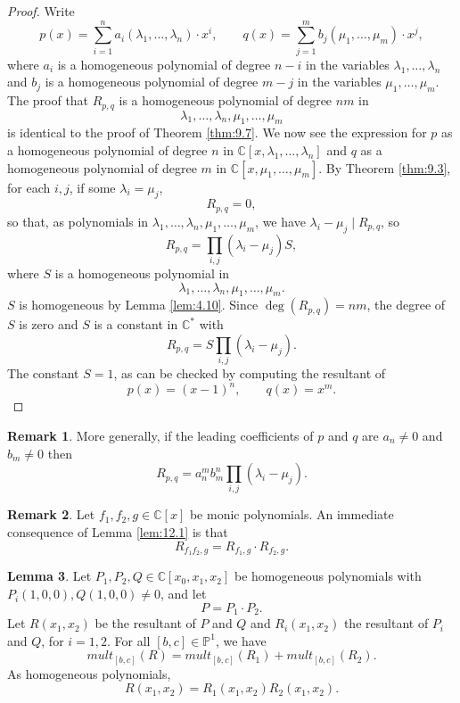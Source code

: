 \documentclass{article}
\newcommand{\C}{\mathbb{C}}
\renewcommand{\P}{\mathbb{P}}
\newcommand{\rb}[1]{\left( #1 \right)}
\renewcommand{\sb}[1]{\left[ #1 \right]}
\theoremstyle{definition}\newtheorem{definition}{Definition}[section]
\theoremstyle{definition}\newtheorem{notation}[definition]{Notation}
\theoremstyle{definition}\newtheorem{remark}[definition]{Remark}
\theoremstyle{definition}\newtheorem{example1}[definition]{Example}
\theoremstyle{definition}\newtheorem{fact}{Fact}
\theoremstyle{definition}\newtheorem{exercise}{Exercise}
\theoremstyle{definition}\newtheorem*{example2}{Example}
\newtheorem{lemma}[definition]{Lemma}
\begin{document}
\begin{proof}
Write
$$ p\rb{x} = \sum_{i = 1}^n a_i\rb{\lambda_1, \dots, \lambda_n} \cdot x^i, \qquad q\rb{x} = \sum_{j = 1}^m b_j\rb{\mu_1, \dots, \mu_m} \cdot x^j, $$
where $ a_i $ is a homogeneous polynomial of degree $ n - i $ in the variables $ \lambda_1, \dots, \lambda_n $ and $ b_j $ is a homogeneous polynomial of degree $ m - j $ in the variables $ \mu_1, \dots, \mu_m $. The proof that $ R_{p, q} $ is a homogeneous polynomial of degree $ nm $ in
$$ \lambda_1, \dots, \lambda_n, \mu_1, \dots, \mu_m $$
is identical to the proof of Theorem \ref{thm:9.7}. We now see the expression for $ p $ as a homogeneous polynomial of degree $ n $ in $ \C\sb{x, \lambda_1, \dots, \lambda_n} $ and $ q $ as a homogeneous polynomial of degree $ m $ in $ \C\sb{x, \mu_1, \dots, \mu_m} $. By Theorem \ref{thm:9.3}, for each $ i, j $, if some $ \lambda_i = \mu_j $,
$$ R_{p, q} = 0, $$
so that, as polynomials in $ \lambda_1, \dots, \lambda_n, \mu_1, \dots, \mu_m $, we have $ \lambda_i - \mu_j \mid R_{p, q} $, so
$$ R_{p, q} = \prod_{i, j} \rb{\lambda_i - \mu_j}S, $$
where $ S $ is a homogeneous polynomial in
$$ \lambda_1, \dots, \lambda_n, \mu_1, \dots, \mu_m. $$
$ S $ is homogeneous by Lemma \ref{lem:4.10}. Since $ \deg\rb{R_{p, q}} = nm $, the degree of $ S $ is zero and $ S $ is a constant in $ \C^* $ with
$$ R_{p, q} = S\prod_{i, j} \rb{\lambda_i - \mu_j}. $$
The constant $ S = 1 $, as can be checked by computing the resultant of
$$ p\rb{x} = \rb{x - 1}^n, \qquad q\rb{x} = x^m. $$
\end{proof}

\begin{remark}
More generally, if the leading coefficients of $ p $ and $ q $ are $ a_n \ne 0 $ and $ b_m \ne 0 $ then
$$ R_{p, q} = a_n^mb_m^n\prod_{i, j} \rb{\lambda_i - \mu_j}. $$
\end{remark}

\begin{remark}
\label{rem:12.3}
Let $ f_1, f_2, g \in \C\sb{x} $ be monic polynomials. An immediate consequence of Lemma \ref{lem:12.1} is that
$$ R_{f_1f_2, g} = R_{f_1, g} \cdot R_{f_2, g}. $$
\end{remark}

\begin{lemma}
\label{lem:12.4}
Let $ P_1, P_2, Q \in \C\sb{x_0, x_1, x_2} $ be homogeneous polynomials with $ P_i\rb{1, 0, 0}, Q\rb{1, 0, 0} \ne 0 $, and let
$$ P = P_1 \cdot P_2. $$
Let $ R\rb{x_1, x_2} $ be the resultant of $ P $ and $ Q $ and $ R_i\rb{x_1, x_2} $ the resultant of $ P_i $ and $ Q $, for $ i = 1, 2 $. For all $ \sb{b, c} \in \P^1 $, we have
$$ mult_{\sb{b, c}}\rb{R} = mult_{\sb{b, c}}\rb{R_1} + mult_{\sb{b, c}}\rb{R_2}. $$
As homogeneous polynomials,
$$ R\rb{x_1, x_2} = R_1\rb{x_1, x_2}R_2\rb{x_1, x_2}. $$
\end{lemma}
\end{document}
